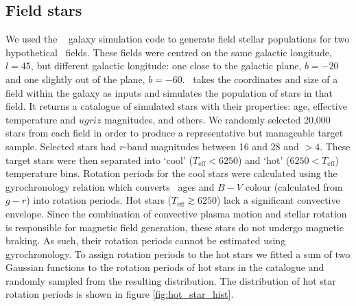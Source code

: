\subsection{Field stars}
We used the \TRILEGAL\ \citep{Girardi2012} galaxy simulation code to generate
field stellar populations for two hypothetical \LSST\ fields.
These fields were centred on the same galactic longitude, $l=45$, but
different galactic longitude: one close to the galactic plane, $b=-20$ and one
slightly out of the plane, $b=-60$.
\TRILEGAL\ takes the coordinates and size of a field within the galaxy as
inputs and simulates the population of stars in that field.
It returns a catalogue of simulated stars with their properties: age,
effective temperature and $ugriz$ magnitudes, and others.
We randomly selected 20,000 stars from each field in order to produce a
representative but manageable target sample.
Selected stars had $r$-band magnitudes between 16 and 28 and \logg $>4$.
These target stars were then separated into `cool' ($T_{\mathrm{eff}}< 6250$)
and `hot' ($6250 < T_{\mathrm{eff}}$) temperature bins.
Rotation periods for the cool stars were calculated using the
\citet{Angus2015} gyrochronology relation which converts \TRILEGAL\ ages and
$B-V$ colour (calculated from \TRILEGAL\ $g-r$) into rotation periods.
Hot stars ($T_{\mathrm{eff}}\gtrsim 6250$) lack a significant convective
envelope.
Since the combination of convective plasma motion and stellar rotation is
responsible for magnetic field generation, these stars do not undergo magnetic
braking.
As such, their rotation periods cannot be estimated using gyrochronology.
To assign rotation periods to the hot stars we fitted a sum of two Gaussian
functions to the rotation periods of hot stars in the \citet{Mcquillan2014}
catalogue and randomly sampled from the resulting distribution.
The distribution of hot star rotation periods is shown in figure
\ref{fig:hot_star_hist}.

